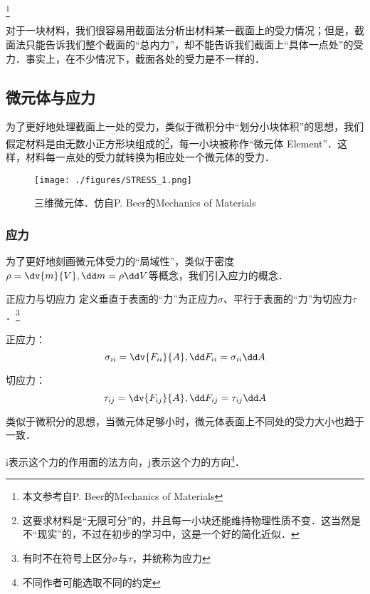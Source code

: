 
\begin{issues}
\issueDraft
\issueTODO
\end{issues}

\footnote{本文参考自P. Beer的Mechanics of Materials}

对于一块材料，我们很容易用截面法分析出材料某一截面上的受力情况；但是，截面法只能告诉我们整个截面的“总内力”，却不能告诉我们截面上“具体一点处”的受力．事实上，在不少情况下，截面各处的受力是不一样的．

\subsection{微元体与应力}
为了更好地处理截面上一处的受力，类似于微积分中“划分小块体积”的思想，我们假定材料是由无数小正方形块组成的\footnote{这要求材料是“无限可分”的，并且每一小块还能维持物理性质不变．这当然是不“现实”的，不过在初步的学习中，这是一个好的简化近似．}，每一小块被称作“微元体 Element”．这样，材料每一点处的受力就转换为相应处一个微元体的受力．

\begin{figure}[ht]
\centering
\texttt{[image: ./figures/STRESS\_1.png]}
\caption{三维微元体．仿自P. Beer的Mechanics of Materials} \label{STRESS_fig1}
\end{figure}

\subsubsection{应力}

为了更好地刻画微元体受力的“局域性”，类似于密度$\rho=\dv{m}{V}, \dd m = \rho \dd V$等概念，我们引入应力的概念．

\begin{definition}{正应力与切应力}
定义垂直于表面的“力”为正应力$\sigma$、平行于表面的“力”为切应力$\tau$．\footnote{有时不在符号上区分$\sigma$与$\tau$，并统称为应力}

正应力：$$\sigma_{ii} =\dv{F_{ii}}{A}, \dd F_{ii} = \sigma_{ii} \dd A$$

切应力：$$\tau_{ij}=\dv{F_{ij}}{A}, \dd F_{ij} = \tau_{ij} \dd A$$

类似于微积分的思想，当微元体足够小时，微元体表面上不同处的受力大小也趋于一致．

i表示这个力的作用面的法方向，j表示这个力的方向\footnote{不同作者可能选取不同的约定}．
\end{definition}


